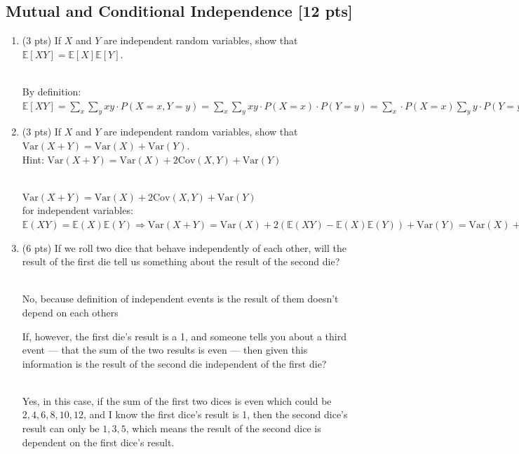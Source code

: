 \documentclass[a4paper]{article}
\theoremstyle{definition}
\newcommand{\Var}{\mathrm{Var}}
\newcommand{\Cov}{\mathrm{Cov}}
\newenvironment{soln}{
	\leavevmode\color{blue}\ignorespaces
}{}
\begin{document}
	\subsection{Mutual and Conditional Independence [12 pts]}
	\begin{enumerate}
		\item (3 pts) If $X$ and $Y$ are independent random variables, show that
		$\mathbb{E}[XY] = \mathbb{E}[X]\mathbb{E}[Y]$.
		
		\begin{soln}\\
		By definition: $\mathbb{E}[XY] = \sum_x \sum_y x y \cdot P(X=x,Y=y) = \sum_x \sum_y x y \cdot P(X=x) \cdot P(Y=y)= \sum_x \cdot P(X=x) \sum_y y \cdot P(Y=y)  = \mathbb{E}[X]\mathbb{E}[Y]$
		\end{soln}
		
		\item (3 pts) If $X$ and $Y$ are independent random variables, show that
		$\Var(X+Y) = \Var(X) + \Var(Y)$. \\
		Hint: $\Var(X+Y) = \Var(X) + 2\Cov(X, Y) + \Var(Y)$
		
		\begin{soln}\\
			$\Var(X+Y) = \Var(X) + 2\Cov(X, Y) + \Var(Y)$ \\
			for independent variables: $\mathbb{E}(XY) = \mathbb{E}(X) \mathbb{E}(Y) \Rightarrow \Var(X+Y) = \Var(X) + 2(\mathbb{E}(XY) - \mathbb{E}(X)\mathbb{E}(Y)) + \Var(Y) = \Var(X) + \Var(Y)$   \\
		\end{soln}
		
		\item (6 pts) If we roll two dice that behave independently of each
		other, will the result of the first die tell us something about the
		result of the second die? 
		
		\begin{soln}\\
		No, because definition of independent events is the result of them doesn't depend on each others\end{soln}
		
		If, however, the first die's result is a 1,
		and someone tells you about a third event --- that the sum of the two
		results is even --- then given this information is the result of the second die
		independent of the first die? 
		
		\begin{soln}\\
		Yes, in this case, if the sum of the first two dices is even which could be ${2,4,6,8,10,12}$, and I know the first dice's result is 1, then the second dice's result can only be ${1,3,5}$, which means the result of the second dice is dependent on the first dice's result.
		\end{soln}
	\end{enumerate}
	
\end{document}
